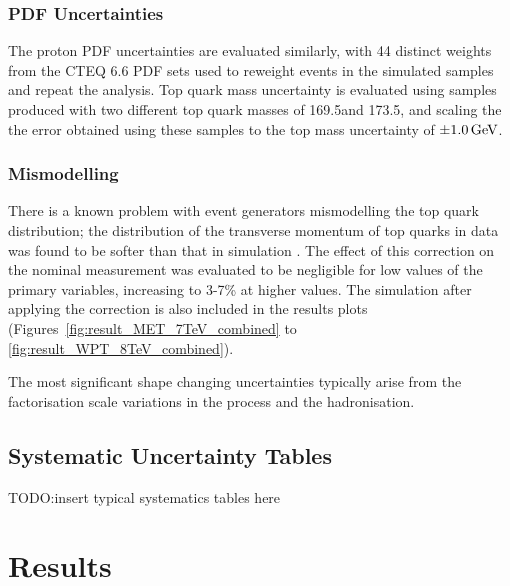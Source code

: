 \subsubsection{PDF Uncertainties}
\label{sss:PDF_uncertainties}
The proton PDF uncertainties are evaluated similarly, with 44 distinct weights from the CTEQ 6.6 PDF sets used
to reweight events in the simulated samples and repeat the analysis.
Top quark mass uncertainty is evaluated using \ttbar samples produced with two different top quark masses of
169.5\GeV and 173.5\GeV, and scaling the the error obtained using these samples to the top mass uncertainty of
$\pm1.0\,\text{Ge\hspace{-.08em}V}$.

\subsubsection{\ttbar \pt Mismodelling}
\label{sss:top_pt_modelling}
There is a known problem with event generators mismodelling the top quark \pt distribution; the distribution
of the transverse momentum of top quarks in data was found to be softer than that in simulation
\cite{Chatrchyan:2012saa}. The effect of this correction on the nominal measurement was evaluated to be
negligible for low values of the primary variables, increasing to 3-7\% at higher values. The \MADGRAPH
simulation after applying the \tquark \pt correction is also included in the results plots
(Figures~\ref{fig:result_MET_7TeV_combined} to \ref{fig:result_WPT_8TeV_combined}).

The most significant shape changing uncertainties typically arise from the factorisation scale variations in
the \ttbar process and the hadronisation.

\subsection{Systematic Uncertainty Tables}
\label{ss:systematic_uncertainty_tables}

TODO:insert typical systematics tables here
%
%

\section{Results}
\label{s:results}

